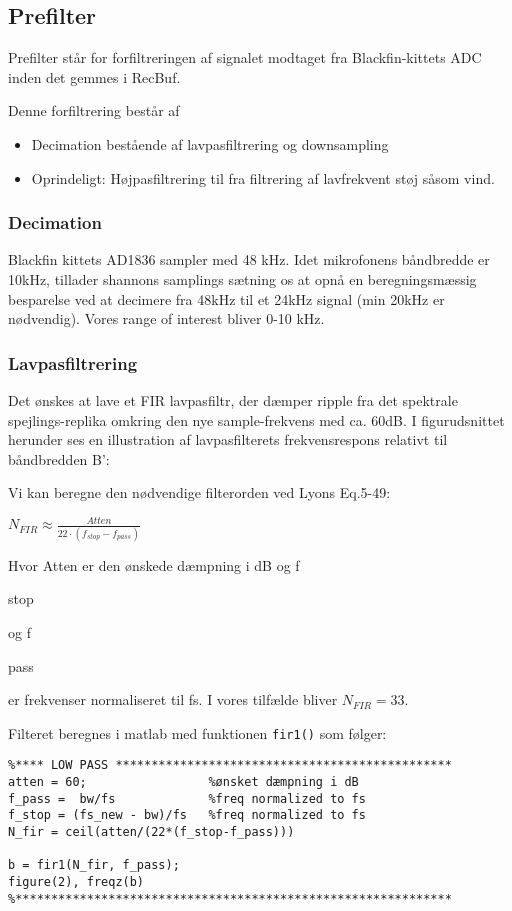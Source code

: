 \subsection{Prefilter}
Prefilter står for forfiltreringen af signalet modtaget fra Blackfin-kittets ADC inden det gemmes i RecBuf.

Denne forfiltrering består af
\begin{itemize}
	\item Decimation bestående af lavpasfiltrering og downsampling
	\item Oprindeligt: Højpasfiltrering til fra filtrering af lavfrekvent støj såsom vind.
\end{itemize}

\subsubsection{Decimation}
Blackfin kittets AD1836 sampler med 48 kHz. Idet mikrofonens båndbredde er 10kHz, tillader shannons samplings sætning os at opnå en beregningsmæssig besparelse ved at decimere fra 48kHz til et 24kHz signal (min 20kHz er nødvendig).
Vores range of interest bliver 0-10 kHz.

\subsubsection*{Lavpasfiltrering} 
Det ønskes at lave et FIR lavpasfiltr, der dæmper ripple fra det spektrale spejlings-replika omkring den nye sample-frekvens med ca. 60dB. 
I figurudsnittet herunder ses en illustration af lavpasfilterets frekvensrespons relativt til båndbredden B':

Vi kan beregne den nødvendige filterorden ved Lyons Eq.5-49:
\begin{center}
${ N }_{ FIR }\approx \frac { Atten }{ 22\cdot \left( { f }_{ stop }-{ f }_{ pass } \right)  }$
\end{center}
Hvor Atten er den ønskede dæmpning i dB og f\begin{tiny}stop\end{tiny} og f\begin{tiny}pass\end{tiny} er frekvenser normaliseret til fs. I vores tilfælde bliver ${ N }_{ FIR }=33$.

Filteret beregnes i matlab med funktionen \verb+fir1()+ som følger:
\begin{verbatim}%**** LOW PASS ***********************************************
atten = 60;                 %ønsket dæmpning i dB
f_pass =  bw/fs             %freq normalized to fs
f_stop = (fs_new - bw)/fs   %freq normalized to fs
N_fir = ceil(atten/(22*(f_stop-f_pass)))

b = fir1(N_fir, f_pass);
figure(2), freqz(b)
%*************************************************************
\end{verbatim}

